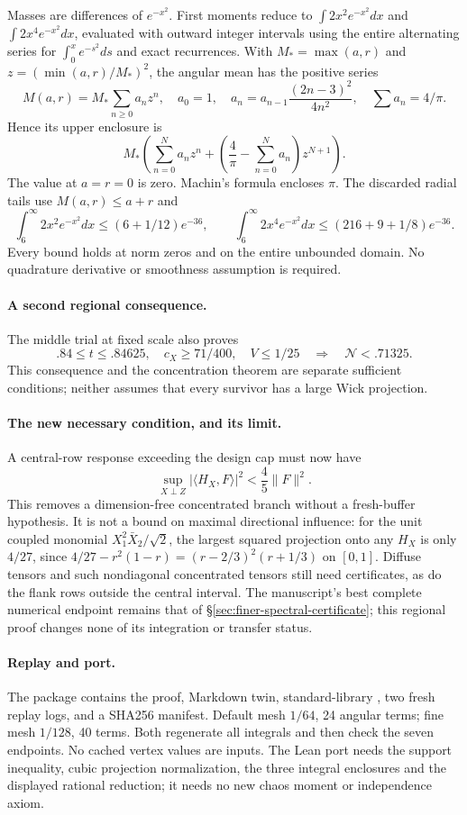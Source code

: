 Masses are differences of $e^{-x^2}$. First moments reduce to
$\int2x^2e^{-x^2}dx$ and $\int2x^4e^{-x^2}dx$, evaluated with outward
integer intervals using the entire alternating series for
$\int_0^x e^{-s^2}ds$ and exact recurrences. With $M_*=\max(a,r)$ and
$z=(\min(a,r)/M_*)^2$, the angular mean has the positive series
\[
 M(a,r)=M_*\sum_{n\ge0}a_nz^n,\quad
 a_0=1,\quad a_n=a_{n-1}\frac{(2n-3)^2}{4n^2},\quad
 \sum a_n=4/\pi.
\]
Hence its upper enclosure is
\[
 M_*\left(\sum_{n=0}^Na_nz^n+
            \left(\frac4\pi-\sum_{n=0}^Na_n\right)z^{N+1}\right).
\]
The value at $a=r=0$ is zero. Machin's formula encloses $\pi$.
The discarded radial tails use $M(a,r)\le a+r$ and
\[
 \int_6^\infty2x^2e^{-x^2}dx\le(6+1/12)e^{-36},\qquad
 \int_6^\infty2x^4e^{-x^2}dx\le(216+9+1/8)e^{-36}.
\]
Every bound holds at norm zeros and on the entire unbounded domain.
No quadrature derivative or smoothness assumption is required.

\paragraph{A second regional consequence.}
The middle trial at fixed scale also proves
\[
 .84\le t\le .84625,\quad c_X\ge71/400,\quad V\le1/25
 \quad\Longrightarrow\quad\mathcal N<.71325.
\]
This consequence and the concentration theorem are separate sufficient
conditions; neither assumes that every survivor has a large Wick
projection.

\paragraph{The new necessary condition, and its limit.}
A central-row response exceeding the design cap must now have
\[
 \boxed{\quad\sup_{X\perp Z}|\langle H_X,F\rangle|^2
                     <\frac45\|F\|^2.\quad}
\]
This removes a dimension-free concentrated branch without a fresh-buffer
hypothesis. It is not a bound on maximal directional influence: for the
unit coupled monomial $X_1^2\bar X_2/\sqrt2$, the largest squared
projection onto any $H_X$ is only $4/27$, since
$4/27-r^2(1-r)=(r-2/3)^2(r+1/3)$ on $[0,1]$.
Diffuse tensors and such nondiagonal concentrated tensors still need
certificates, as do the flank rows outside the central interval.
The manuscript's best complete numerical endpoint remains that of
\S\ref{sec:finer-spectral-certificate}; this regional proof changes none
of its integration or transfer status.

\paragraph{Replay and port.}
The package  contains the
proof, Markdown twin, standard-library , two fresh
replay logs, and a SHA256 manifest. Default mesh $1/64$, 24 angular terms;
fine mesh $1/128$, 40 terms. Both regenerate all integrals and then check
the seven endpoints. No cached vertex values are inputs. The Lean port
needs the support inequality, cubic projection normalization, the three
integral enclosures and the displayed rational reduction; it needs no
new chaos moment or independence axiom.

